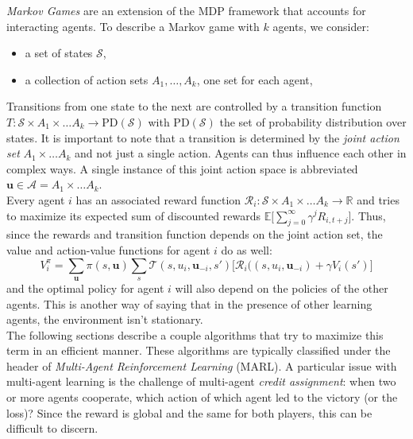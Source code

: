 \emph{Markov Games} \cite{littman1994markov} are an extension of the MDP framework that accounts for interacting agents. To describe a Markov game with $k$ agents, we consider:
\begin{itemize}
    \item a set of states $\mathcal{S}$,
    \item a collection of action sets $A_1, \ldots, A_k$, one set for each agent,
\end{itemize}
Transitions from one state to the next are controlled by a transition function $T: \mathcal{S} \times A_1 \times \ldots A_k \rightarrow \text{PD}(\mathcal{S})$ with $\text{PD}(\mathcal{S})$ the set of probability distribution over states. It is important to note that a transition is determined by the \emph{joint action set} $A_1 \times \ldots A_k$ and not just a single action. Agents can thus influence each other in complex ways. A single instance of this joint action space is abbreviated $\bm{u} \in \mathcal{A} = A_1 \times \ldots A_k$. \\

Every agent $i$ has an associated reward function $\mathcal{R}_i: \mathcal{S} \times A_1 \times \ldots A_k \rightarrow \mathbb{R}$ and tries to maximize its expected sum of discounted rewards $\mathbb{E}\Big [ \sum_{j=0}^{\infty} \gamma^j R_{i, t+j} \Big ]$. Thus, since the rewards and transition function depends on the joint action set, the value and action-value functions for agent $i$ do as well:
\begin{equation}
    V_i^{\pi} = \sum_{\bm{u}}\pi(s, \bm{u}) \sum_{s} \mathcal{T}(s, u_i, \bm{u}_{-i}, s') \big [\mathcal{R}_i((s, u_i, \bm{u}_{-i}) + \gamma V_i(s')]
\end{equation}
and the optimal policy for agent $i$ will also depend on the policies of the other agents. This is another way of saying that in the presence of other learning agents, the environment isn't stationary.\\

The following sections describe a couple algorithms that try to maximize this term in an efficient manner. These algorithms are typically classified under the header of \emph{Multi-Agent Reinforcement Learning} (MARL).
A particular issue with multi-agent learning is the challenge of multi-agent \emph{credit assignment}: when two or more agents cooperate, which action of which agent led to the victory (or the loss)? Since the reward is global and the same for both players, this can be difficult to discern.
